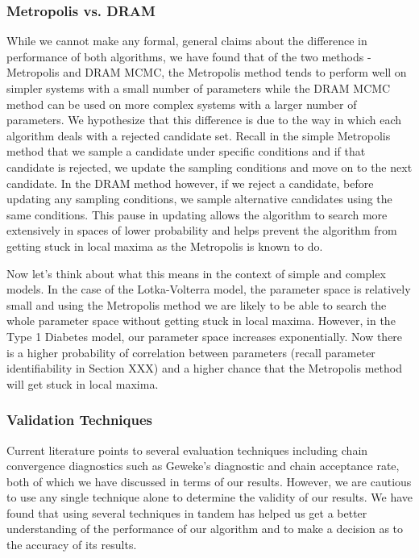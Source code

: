 \documentclass{article}
\begin{document}
\subsubsection{Metropolis vs. DRAM}
While we cannot make any formal, general claims about the difference in performance of both algorithms, we have found that of the two methods - Metropolis and DRAM MCMC, the Metropolis method tends to perform well on simpler systems with a small number of parameters while the DRAM MCMC method can be used on more complex systems with a larger number of parameters. We hypothesize that this difference is due to the way in which each algorithm deals with a rejected candidate set. Recall in the simple Metropolis method that we sample a  candidate under specific conditions and if that candidate is rejected, we update the sampling conditions and move on to the next candidate. In the DRAM method however, if we reject a candidate, before updating any sampling conditions, we sample alternative candidates using the same conditions. This pause in updating allows the algorithm to search more extensively in spaces of lower probability and helps prevent the algorithm from getting stuck in local maxima as the Metropolis is known to do. \par Now let's think about what this means in the context of simple and complex models. In the case of the Lotka-Volterra model, the parameter space is relatively small and using the Metropolis method we are likely to be able to search the whole parameter space without getting stuck in local maxima. However, in the Type 1 Diabetes model, our parameter space increases exponentially. Now there is a higher probability of correlation between parameters (recall parameter identifiability in Section XXX) and a higher chance that the Metropolis method will get stuck in local maxima.
\subsubsection{Validation Techniques}
Current literature points to several evaluation techniques including chain convergence diagnostics such as Geweke's diagnostic and chain acceptance rate, both of which we have discussed in terms of our results. However, we are cautious to use any single technique alone to determine the validity of our results. We have found that using several techniques in tandem has helped us get a better understanding of the performance of our algorithm and to make a decision as to the accuracy of its results. \vspace{4 mm}
\end{document}
